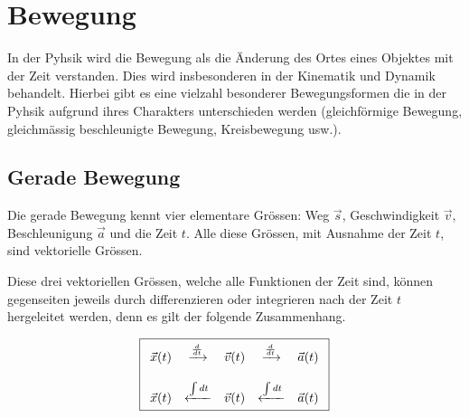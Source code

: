 



\chapter{Bewegung}

In der Pyhsik wird die Bewegung als die Änderung des Ortes eines Objektes
mit der Zeit verstanden. Dies wird insbesonderen in der Kinematik und
Dynamik behandelt. Hierbei gibt es eine vielzahl besonderer 
Bewegungsformen die in der Pyhsik aufgrund ihres Charakters unterschieden
werden (gleichförmige Bewegung, gleichmässig beschleunigte Bewegung, 
Kreisbewegung usw.).

\newpage
\section{Gerade Bewegung}
Die gerade Bewegung kennt vier elementare Grössen: 
Weg $\vec{s}$, Geschwindigkeit $\vec{v}$, Beschleunigung $\vec{a}$ und
die Zeit $t$. Alle diese Grössen, mit Ausnahme der Zeit $t$, sind 
vektorielle Grössen.

Diese drei vektoriellen Grössen, welche alle Funktionen der Zeit
sind, können gegenseiten jeweils durch differenzieren oder integrieren 
nach der Zeit $t$ hergeleitet werden, denn es gilt der folgende 
Zusammenhang.

\[ \boxed{\begin{array}{c c c c c}
	\vec{x}(t) 
		& \xrightarrow{\frac{d}{dt}}
	& \vec{v}(t)
		& \xrightarrow{\frac{d}{dt}}
	& \vec{a}(t) \\
	& & & & \\
	\vec{x}(t) 
		& \xleftarrow{\int dt}
	& \vec{v}(t)
		& \xleftarrow{\int dt}
	& \vec{a}(t) \\
\end{array}} \]

